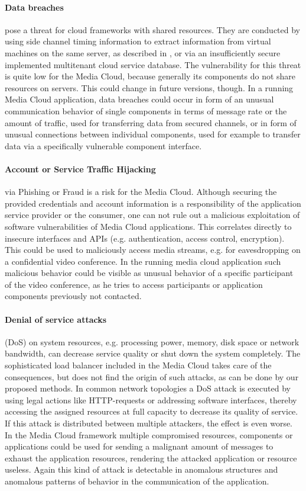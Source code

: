 \documentclass{llncs}
\begin{document}
\paragraph{Data breaches} pose a threat for cloud frameworks with shared resources. They are conducted by using side channel timing information to extract information from virtual machines on the same server, as described in \cite{ZhaJueReiRis12}, or via an insufficiently secure implemented multitenant cloud service database. The vulnerability for this threat is quite low for the Media Cloud, because generally its components do not share resources on servers. This could change in future versions, though. In a running Media Cloud application, data breaches could occur in form of an unusual communication behavior of single components in terms of message rate or the amount of traffic, used for transferring data from secured channels, or in form of unusual connections between individual components, used for example to transfer data via a specifically vulnerable component interface.

\paragraph{Account or Service Traffic Hijacking} via Phishing or Fraud is a risk for the Media Cloud. Although securing the provided credentials and account information is a responsibility of the application service provider or the consumer, one can not rule out a malicious exploitation of software vulnerabilities of Media Cloud applications. This correlates directly to insecure interfaces and APIs (e.g. authentication, access control, encryption). This could be used to maliciously access media streams, e.g. for eavesdropping on a confidential video conference. In the running media cloud application such malicious behavior could be visible as unusual behavior of a specific participant of the video conference, as he tries to access participants or application components previously not contacted.

\paragraph{Denial of service attacks} (DoS) on system resources, e.g. processing power, memory, disk space or network bandwidth, can decrease service quality or shut down the system completely. The sophisticated load balancer included in the Media Cloud takes care of the consequences, but does not find the origin of such attacks, as can be done by our proposed methods. In common network topologies a DoS attack is executed by using legal actions like HTTP-requests or addressing software interfaces, thereby accessing the assigned resources at full capacity to decrease its quality of service. If this attack is distributed between multiple attackers, the effect is even worse. In the Media Cloud framework multiple compromised resources, components or applications could be used for sending a malignant amount of messages to exhaust the application resources, rendering the attacked application or resource useless. Again this kind of attack is detectable in anomalous structures and anomalous patterns of behavior in the communication of the application. 
\end{document}
